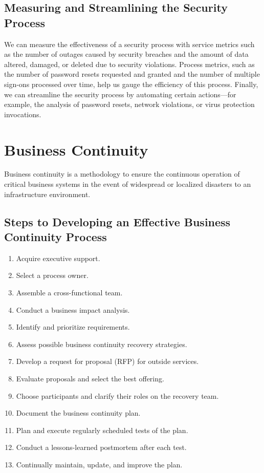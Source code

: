 \documentclass[a4]{article}
\begin{document}
\begin{multicols}{3}
\subsection{Measuring and Streamlining the Security Process}
We can measure the effectiveness of a security process with service metrics such as the number of outages caused by 
security breaches and the amount of data altered, damaged, or deleted due to security violations. 
Process metrics, such as the number of password resets requested and granted and the number of multiple sign-ons 
processed over time, help us gauge the efficiency of this process. 
Finally, we can streamline the security process by automating certain actions—for example, the analysis of password 
resets, network violations, or virus protection invocations.

\section{Business Continuity}
Business continuity is a methodology to ensure the continuous operation of critical business systems in the event
of widespread or localized disasters to an infrastructure environment.

\subsection{Steps to Developing an Effective Business Continuity Process}
\begin{enumerate}
    \item Acquire executive support.
    \item Select a process owner.
    \item Assemble a cross-functional team.
    \item Conduct a business impact analysis.
    \item Identify and prioritize requirements.
    \item Assess possible business continuity recovery strategies.
    \item Develop a request for proposal (RFP) for outside services.
    \item Evaluate proposals and select the best offering.
    \item Choose participants and clarify their roles on the recovery team.
    \item Document the business continuity plan.
    \item Plan and execute regularly scheduled tests of the plan.
    \item Conduct a lessons-learned postmortem after each test.
    \item Continually maintain, update, and improve the plan.
\end{enumerate}


\end{multicols}
\end{document}
